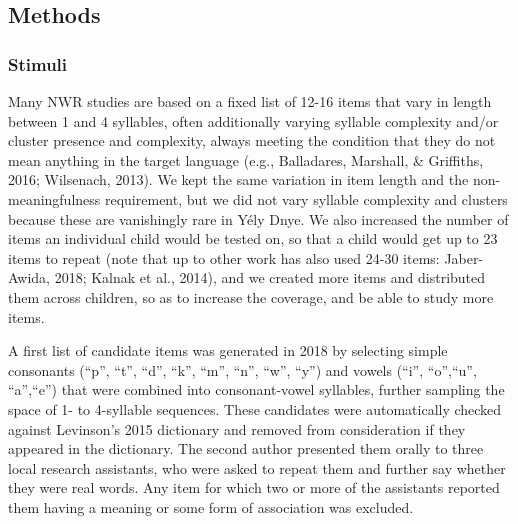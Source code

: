 \documentclass[english,,man,floatsintext]{apa6}
\begin{document}
\hypertarget{methods}{%
\subsection{Methods}\label{methods}}

\hypertarget{stimuli}{%
\subsubsection{Stimuli}\label{stimuli}}

Many NWR studies are based on a fixed list of 12-16 items that vary in length between 1 and 4 syllables, often additionally varying syllable complexity and/or cluster presence and complexity, always meeting the condition that they do not mean anything in the target language (e.g., Balladares, Marshall, \& Griffiths, 2016; Wilsenach, 2013). We kept the same variation in item length and the non-meaningfulness requirement, but we did not vary syllable complexity and clusters because these are vanishingly rare in Yély Dnye. We also increased the number of items an individual child would be tested on, so that a child would get up to 23 items to repeat (note that up to other work has also used 24-30 items: Jaber-Awida, 2018; Kalnak et al., 2014), and we created more items and distributed them across children, so as to increase the coverage, and be able to study more items.

A first list of candidate items was generated in 2018 by selecting simple consonants (\enquote{p}, \enquote{t}, \enquote{d}, \enquote{k}, \enquote{m}, \enquote{n}, \enquote{w}, \enquote{y}) and vowels (\enquote{i}, \enquote{o},\enquote{u}, \enquote{a},\enquote{e}) that were combined into consonant-vowel syllables, further sampling the space of 1- to 4-syllable sequences. These candidates were automatically checked against Levinson's 2015 dictionary and removed from consideration if they appeared in the dictionary. The second author presented them orally to three local research assistants, who were asked to repeat them and further say whether they were real words. Any item for which two or more of the assistants reported them having a meaning or some form of association was excluded.
\end{document}
